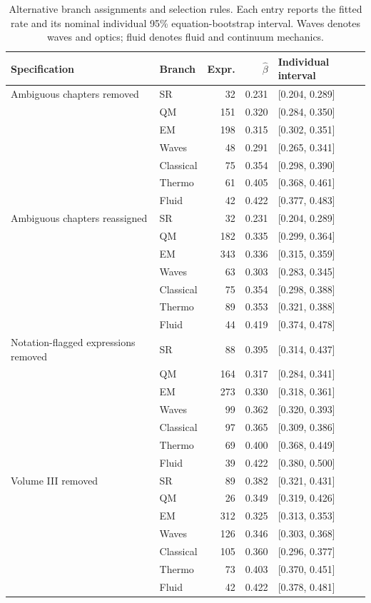 \documentclass[10pt]{article}
\begin{document}
\begin{table}[H]\centering\scriptsize
\begin{tabular}{llrrl}\toprule
Specification & Branch & Expr. & $\hat\beta$ & Individual interval\\\midrule
Ambiguous chapters removed & SR & 32 & 0.231 & [0.204, 0.289] \\
 & QM & 151 & 0.320 & [0.284, 0.350] \\
 & EM & 198 & 0.315 & [0.302, 0.351] \\
 & Waves & 48 & 0.291 & [0.265, 0.341] \\
 & Classical & 75 & 0.354 & [0.298, 0.390] \\
 & Thermo & 61 & 0.405 & [0.368, 0.461] \\
 & Fluid & 42 & 0.422 & [0.377, 0.483] \\
\midrule
Ambiguous chapters reassigned & SR & 32 & 0.231 & [0.204, 0.289] \\
 & QM & 182 & 0.335 & [0.299, 0.364] \\
 & EM & 343 & 0.336 & [0.315, 0.359] \\
 & Waves & 63 & 0.303 & [0.283, 0.345] \\
 & Classical & 75 & 0.354 & [0.298, 0.388] \\
 & Thermo & 89 & 0.353 & [0.321, 0.388] \\
 & Fluid & 44 & 0.419 & [0.374, 0.478] \\
\midrule
Notation-flagged expressions removed & SR & 88 & 0.395 & [0.314, 0.437] \\
 & QM & 164 & 0.317 & [0.284, 0.341] \\
 & EM & 273 & 0.330 & [0.318, 0.361] \\
 & Waves & 99 & 0.362 & [0.320, 0.393] \\
 & Classical & 97 & 0.365 & [0.309, 0.386] \\
 & Thermo & 69 & 0.400 & [0.368, 0.449] \\
 & Fluid & 39 & 0.422 & [0.380, 0.500] \\
\midrule
Volume III removed & SR & 89 & 0.382 & [0.321, 0.431] \\
 & QM & 26 & 0.349 & [0.319, 0.426] \\
 & EM & 312 & 0.325 & [0.313, 0.353] \\
 & Waves & 126 & 0.346 & [0.303, 0.368] \\
 & Classical & 105 & 0.360 & [0.296, 0.377] \\
 & Thermo & 73 & 0.403 & [0.370, 0.451] \\
 & Fluid & 42 & 0.422 & [0.378, 0.481] \\
\bottomrule\end{tabular}
\caption{Alternative branch assignments and selection rules. Each entry reports the fitted rate and its nominal individual 95\% equation-bootstrap interval. Waves denotes waves and optics; fluid denotes fluid and continuum mechanics.}\label{tab:assignment}
\end{table}
\end{document}

